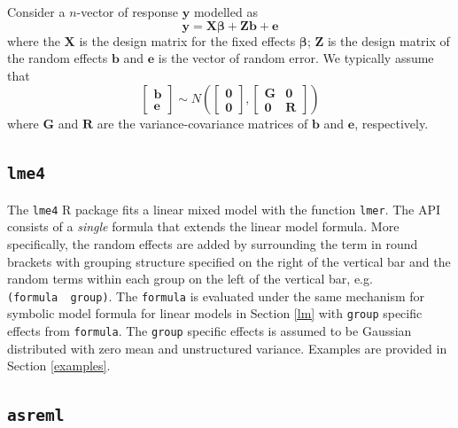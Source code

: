 \documentclass[runningheads]{llncs}
\begin{document}
Consider a \(n\)-vector of response \(\boldsymbol{y}\) modelled as
\begin{equation}
\boldsymbol{y} = \mathbf{X}\boldsymbol{\beta} + \mathbf{Z}\boldsymbol{b} + \boldsymbol{e}
\label{eq:lmm}
\end{equation}
where the \(\mathbf{X}\) is the design matrix for the fixed effects \(\boldsymbol{\beta}\); \(\mathbf{Z}\) is the design matrix of the random effects \(\boldsymbol{b}\) and \(\boldsymbol{e}\) is the vector of random error. We typically assume that
\[\begin{bmatrix}\boldsymbol{b}\\\boldsymbol{e}\end{bmatrix}\sim N\left(\begin{bmatrix}\boldsymbol{0}\\\boldsymbol{0}\end{bmatrix}, \begin{bmatrix}\mathbf{G} & \mathbf{0} \\ \mathbf{0} & \mathbf{R} \end{bmatrix}\right)\]
where \(\mathbf{G}\) and \(\mathbf{R}\) are the variance-covariance matrices of \(\boldsymbol{b}\) and \(\boldsymbol{e}\), respectively.

\hypertarget{lme4}{%
\subsection{\texorpdfstring{\texttt{lme4}}{lme4}}\label{lme4}}

The \texttt{lme4} R package fits a linear mixed model with the function \texttt{lmer}. The API consists of a \emph{single} formula that extends the linear model formula. More specifically, the random effects are added by surrounding the term in round brackets with grouping structure specified on the right of the vertical bar and the random terms within each group on the left of the vertical bar, e.g. \texttt{(formula\ \textbar{}\ group)}. The \texttt{formula} is evaluated under the same mechanism for symbolic model formula for linear models in Section \ref{lm} with \texttt{group} specific effects from \texttt{formula}. The \texttt{group} specific effects is assumed to be Gaussian distributed with zero mean and unstructured variance. Examples are provided in Section \ref{examples}.

\hypertarget{asreml}{%
\subsection{\texorpdfstring{\texttt{asreml}}{asreml}}\label{asreml}}
\end{document}
